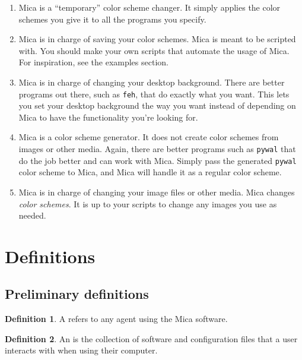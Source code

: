 \documentclass{article}
\theoremstyle{definition}
\newtheorem{definition}{Definition}
\begin{document}
    \begin{enumerate}
        \item Mica is \emph{} a ``temporary'' color scheme changer. It simply applies the color schemes you give it to all the programs you specify.
        \item Mica is \emph{} in charge of saving your color schemes. Mica is meant to be scripted with. You should make your own scripts that automate the usage of Mica. For inspiration, see the examples section.
        \item Mica is \emph{} in charge of changing your desktop background. There are better programs out there, such as \texttt{feh}, that do exactly what you want. This lets you set your desktop background the way you want instead of depending on Mica to have the functionality you're looking for.
        \item Mica is \emph{} a color scheme generator. It does not create color schemes from images or other media. Again, there are better programs such as \texttt{pywal} that do the job better and can work with Mica. Simply pass the generated \texttt{pywal} color scheme to Mica, and Mica will handle it as a regular color scheme.
        \item Mica is \emph{} in charge of changing your image files or other media. Mica changes \emph{color schemes}. It is up to your scripts to change any images you use as needed.
    \end{enumerate}

    \newpage


    \section{Definitions}

    \subsection{Preliminary definitions}

    \begin{definition}
        A  refers to any agent using the Mica software.
    \end{definition}

    \begin{definition}
        An  is the collection of software and configuration files that a user interacts with when using their computer.
    \end{definition}
\end{document}
